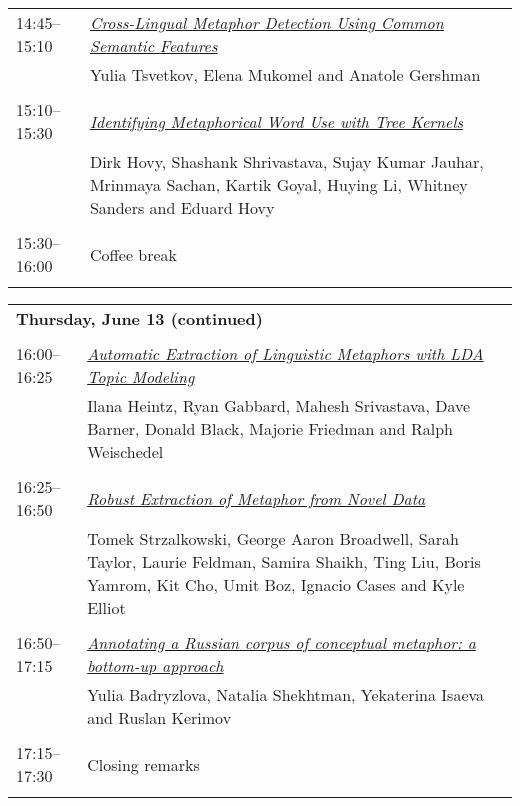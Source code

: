 \begin{tabular}{p{20mm}p{128mm}}
14:45--15:10 & \hyperlink{page.45}{\em Cross-Lingual Metaphor Detection Using Common Semantic Features}\\
         & Yulia Tsvetkov, Elena Mukomel and Anatole Gershman \\
\\

15:10--15:30 & \hyperlink{page.52}{\em Identifying Metaphorical Word Use with Tree Kernels}\\
         & Dirk Hovy, Shashank Shrivastava, Sujay Kumar Jauhar, Mrinmaya Sachan, Kartik Goyal, Huying Li, Whitney Sanders and Eduard Hovy \\
\\

15:30--16:00 & Coffee break \\
\\

\end{tabular}
\newpage
\begin{tabular}{p{20mm}p{138mm}}
\\
\multicolumn{2}{l}{\bf Thursday, June 13 (continued)} \\\\

16:00--16:25 & \hyperlink{page.58}{\em Automatic Extraction of Linguistic Metaphors with LDA Topic Modeling}\\
         & Ilana Heintz, Ryan Gabbard, Mahesh Srivastava, Dave Barner, Donald Black, Majorie Friedman and Ralph Weischedel \\
\\


16:25--16:50 & \hyperlink{page.67}{\em Robust Extraction of Metaphor from Novel Data}\\
         & Tomek Strzalkowski, George Aaron Broadwell, Sarah Taylor, Laurie Feldman, Samira Shaikh, Ting Liu, Boris Yamrom, Kit Cho, Umit Boz, Ignacio Cases and Kyle Elliot \\
\\

16:50--17:15 & \hyperlink{page.77}{\em Annotating a Russian corpus of conceptual metaphor: a bottom-up approach}\\
         & Yulia Badryzlova, Natalia Shekhtman, Yekaterina Isaeva and Ruslan Kerimov \\
\\

17:15--17:30 & Closing remarks \\
\\


\end{tabular}